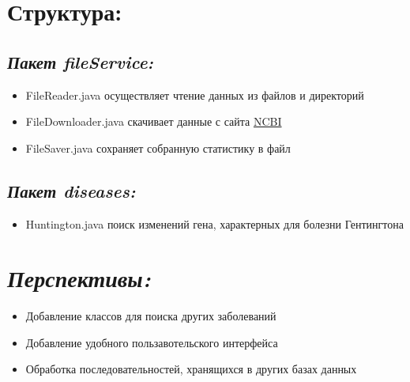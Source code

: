 \documentclass{article}
\begin{document}
        \section {Структура:}
        	\subsection{\emph{Пакет fileService:}}
            	\begin{itemize}
            		\item FileReader.java осуществляет чтение данных из файлов и директорий
                    \item FileDownloader.java скачивает данные с сайта \href{https://www.ncbi.nlm.nih.gov/nuccore}{NCBI}
                    \item FileSaver.java сохраняет собранную статистику в файл
            	\end{itemize}
             \subsection{\emph{Пакет diseases:}}
             	\begin{itemize}
             		\item Huntington.java поиск изменений гена, характерных для болезни Гентингтона 
             	\end{itemize}
       	\section{\emph{Перспективы:}}
        	\begin{itemize}
        		\item Добавление классов для поиска других заболеваний
                \item Добавление удобного пользавотельского интерфейса
                \item Обработка последовательностей, хранящихся в других базах данных
        	\end{itemize}
            
\end{document}
